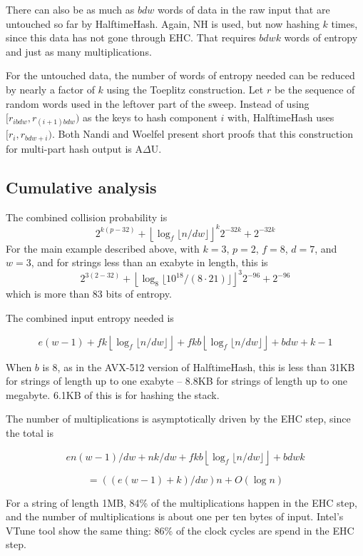 \documentclass[sigconf, nonacm]{acmart}
\begin{document}
There can also be as much as $b d w$ words of data in the raw input that are untouched so far by HalftimeHash.
Again, NH is used, but now hashing $k$ times, since this data has not gone through EHC.
That requires $b d w k$ words of entropy and just as many multiplications.

For the untouched data, the number of words of entropy needed can be reduced by nearly a factor of $k$ using the Toeplitz construction. 
Let $r$ be the sequence of random words used in the leftover part of the sweep.
Instead of using $[r_{i b d w}, r_{(i+1)b d w})$ as the keys to hash component $i$ with, HalftimeHash uses $[r_{i}, r_{bdw + i})$.
Both Nandi and Woelfel present short proofs that this construction for multi-part hash output is A$\Delta$U. \cite{ehc-nandi,woelfel-toeplitz}


\subsection{Cumulative analysis}

The combined collision probability is
\[2^{k(p-32)} + \left\lfloor \log_f \lfloor n / d w \rfloor \right\rfloor^k 2^{-32k} + 2^{-32k}\]
For the main example described above, with $k=3$, $p=2$, $f=8$, $d = 7$, and $w=3$, and for strings less than an exabyte in length, this is
\[2^{3(2-32)} + \left\lfloor \log_8 \lfloor 10^{18} /(8 \cdot 21) \rfloor \right\rfloor^3 2^{-96} + 2^{-96}\]
which is more than 83 bits of entropy.

The combined input entropy needed is

\[
e(w-1)
+ f k \left\lfloor\log_f \lfloor n/dw\rfloor\right\rfloor
+ f k b \left\lfloor\log_f \lfloor n/dw\rfloor\right\rfloor
+ b d w + k - 1
\]

When $b$ is 8, as in the AVX-512 version of HalftimeHash, this is less than 31KB for strings of length up to one exabyte -- 8.8KB for strings of length up to one megabyte.
6.1KB of this is for hashing the stack.

The number of multiplications is asymptotically driven by the EHC step, since the total is

\[
en(w-1)/dw + nk/dw + f k b \left\lfloor\log_f \lfloor n/dw\rfloor\right\rfloor + b d w k
\]

\[
= ((e(w-1) + k)/dw)n + O(\log n)
\]

For a string of length 1MB, 84\% of the multiplications happen in the EHC step, and the number of multiplications is about one per ten bytes of input.
Intel's VTune tool show the same thing: 86\% of the clock cycles are spend in the EHC step.
\end{document}
